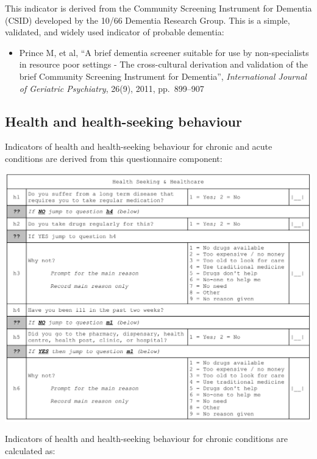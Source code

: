 \documentclass[12pt,a4paper]{book}
\providecommand{\tightlist}{%
  \setlength{\itemsep}{0pt}\setlength{\parskip}{0pt}}
\theoremstyle{definition}
\theoremstyle{definition}
\theoremstyle{definition}
\theoremstyle{remark}
\begin{document}
This indicator is derived from the Community Screening Instrument for
Dementia (CSID) developed by the 10/66 Dementia Research Group. This is
a simple, validated, and widely used indicator of probable dementia:

\begin{itemize}
\tightlist
\item
  Prince M, et al, ``A brief dementia screener suitable for use by
  non-specialists in resource poor settings - The cross-cultural
  derivation and validation of the brief Community Screening Instrument
  for Dementia'', \emph{International Journal of Geriatric Psychiatry},
  26(9), 2011, pp.~899--907
\end{itemize}

\newpage

\hypertarget{health-and-health-seeking-behaviour}{%
\subsection{Health and health-seeking
behaviour}\label{health-and-health-seeking-behaviour}}

Indicators of health and health-seeking behaviour for chronic and acute
conditions are derived from this questionnaire component:

\begin{center}\includegraphics[width=23.97in]{figures/questionnaire08} \end{center}

\newpage

Indicators of health and health-seeking behaviour for chronic conditions
are calculated as:
\end{document}
